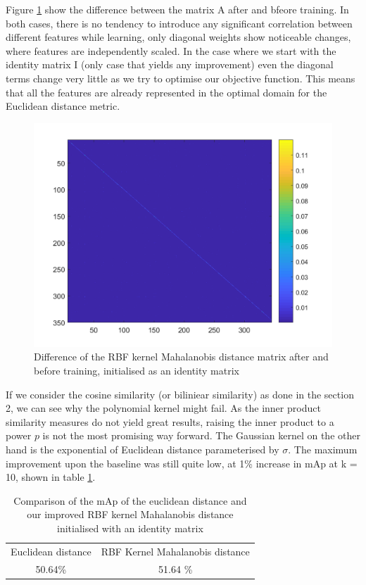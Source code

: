 \documentclass[10pt,technote]{IEEEtran}
\begin{document}
Figure \ref{fig:diff_matrix} show the difference between the matrix A after and bfeore training. In both cases, there is no tendency to introduce any significant correlation between different features while learning, only diagonal weights show noticeable changes, where features are independently scaled. In the case where we start with the identity matrix I (only case that yields any improvement) even the diagonal terms change very little as we try to optimise our objective function. This means that all the features are already represented in the optimal domain for the Euclidean distance metric.

\begin{figure}
    \centering
    \includegraphics[width=\linewidth]{Graphs/A_matrix_diff.png}
    \caption{Difference of the RBF kernel Mahalanobis distance matrix after and before training, initialised as an identity matrix}
    \label{fig:diff_matrix}
\end{figure}

If we consider the cosine similarity (or biliniear similarity) as done in the section 2, we can see why the polynomial kernel might fail. As the inner product similarity measures do not yield great results, raising the inner product to a power $p$ is not the most promising way forward. The Gaussian kernel on the other hand is the exponential of Euclidean distance parameterised by $\sigma$. The maximum improvement upon the baseline was still quite low, at 1\% increase in mAp at k = 10, shown in table \ref{tab:my_label}.

\begin{table}
    \centering
    \begin{tabular}{c|c}
        Euclidean distance & RBF Kernel Mahalanobis distance \\
        50.64\% & 51.64 \%
    \end{tabular}
    \caption{Comparison of the mAp of the euclidean distance and our improved RBF kernel Mahalanobis distance initialised with an identity matrix}
    \label{tab:my_label}
\end{table}
\end{document}
